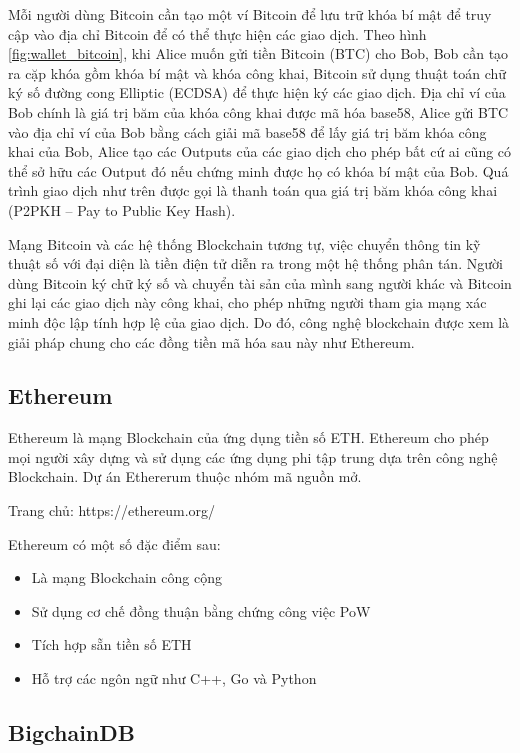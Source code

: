 Mỗi người dùng Bitcoin cần tạo một ví Bitcoin để lưu trữ khóa bí mật để truy cập vào địa chỉ Bitcoin để có thể thực hiện các giao dịch. 
Theo hình \ref{fig:wallet_bitcoin}, khi Alice muốn gửi tiền Bitcoin (BTC) cho Bob, Bob cần tạo ra cặp khóa gồm khóa bí mật và khóa công khai, Bitcoin sử dụng thuật toán chữ ký số đường cong Elliptic (ECDSA) \cite{10.5555/1721909} để thực hiện ký các giao dịch. 
Địa chỉ ví của Bob chính là giá trị băm của khóa công khai được mã hóa base58, Alice gửi BTC vào địa chỉ ví của Bob bằng cách giải mã base58 để lấy giá trị băm khóa công khai của Bob, Alice tạo các Outputs của các giao dịch cho phép bất cứ ai cũng có thể sở hữu các Output đó nếu chứng minh được họ có khóa bí mật của Bob. 
Quá trình giao dịch như trên được gọi là thanh toán qua giá trị băm khóa công khai (P2PKH – Pay to Public Key Hash).

Mạng Bitcoin và các hệ thống Blockchain tương tự, việc chuyển thông tin kỹ thuật số với đại diện là tiền điện tử diễn ra trong một hệ thống phân tán.
Người dùng Bitcoin ký chữ ký số và chuyển tài sản của mình sang người khác và Bitcoin ghi lại các giao dịch này công khai, cho phép những người tham gia mạng xác minh độc lập tính hợp lệ của giao dịch. 
Do đó, công nghệ blockchain được xem là giải pháp chung cho các đồng tiền mã hóa sau này như Ethereum.

\subsection{Ethereum}

Ethereum là mạng Blockchain của ứng dụng tiền số ETH. Ethereum cho phép mọi người xây dựng và sử dụng các ứng dụng phi tập trung dựa trên công nghệ Blockchain. 
Dự án Ethererum thuộc nhóm mã nguồn mở.

Trang chủ: https://ethereum.org/

Ethereum có một số đặc điểm sau:

\begin{itemize}
	\item Là mạng Blockchain công cộng
	\item Sử dụng cơ chế đồng thuận bằng chứng công việc PoW
	\item Tích hợp sẵn tiền số ETH
	\item Hỗ trợ các ngôn ngữ như C++, Go và Python
\end{itemize}

\subsection{BigchainDB}

